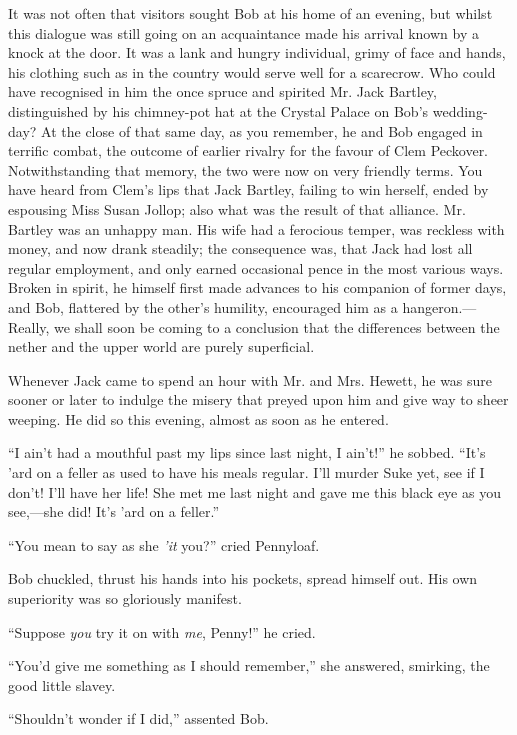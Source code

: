 It was not often that visitors sought Bob at his home of an evening, but
whilst this dialogue was still going on an acquaintance made his arrival
known by a knock at the door. It was a lank and hungry individual, grimy
of face and hands, his clothing such as in the country would serve well
for a {\protect\hypertarget{226}{}{}}scarecrow. Who could have
recognised in him the once spruce and spirited Mr. Jack Bartley,
distinguished by his chimney-pot hat at the Crystal Palace on Bob's
wedding-day? At the close of that same day, as you remember, he and Bob
engaged in terrific combat, the outcome of earlier rivalry for the
favour of Clem Peckover. Notwithstanding that memory, the two were now
on very friendly terms. You have heard from Clem's lips that Jack
Bartley, failing to win herself, ended by espousing Miss Susan Jollop;
also what was the result of that alliance. Mr. Bartley was an unhappy
man. His wife had a ferocious temper, was reckless with money, and now
drank steadily; the consequence was, that Jack had lost all regular
employment, and only earned occasional pence in the most various ways.
Broken in spirit, he himself first made advances to his companion of
former days, and Bob, flattered by the other's humility, encouraged him
as a hangeron.---Really, we shall soon be coming to a conclusion that
the differences between the {\protect\hypertarget{227}{}{}}nether and
the upper world are purely superficial.

Whenever Jack came to spend an hour with Mr. and Mrs. Hewett, he was
sure sooner or later to indulge the misery that preyed upon him and give
way to sheer weeping. He did so this evening, almost as soon as he
entered.

``I ain't had a mouthful past my lips since last night, I ain't!'' he
sobbed. ``It's 'ard on a feller as used to have his meals regular. I'll
murder Suke yet, see if I don't! I'll have her life! She met me last
night and gave me this black eye as you see,---she did! It's 'ard on a
feller.''

``You mean to say as she \emph{'it} you?'' cried Pennyloaf.

Bob chuckled, thrust his hands into his pockets, spread himself out. His
own superiority was so gloriously manifest.

``Suppose \emph{you} try it on with \emph{me}, Penny!'' he cried.

``You'd give me something as I should remember,'' she answered,
smirking, the good little slavey.

{\protect\hypertarget{228}{}{}}``Shouldn't wonder if I did,'' assented
Bob.

